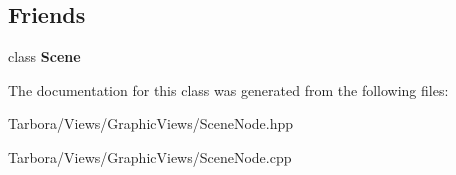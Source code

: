 \subsection*{Friends}
\begin{DoxyCompactItemize}
\item 
\mbox{\label{classTarbora_1_1SceneNode_a032858ae1fe02d2d1170981c2af2d67c}} 
class {\bfseries Scene}
\end{DoxyCompactItemize}


The documentation for this class was generated from the following files\+:\begin{DoxyCompactItemize}
\item 
Tarbora/\+Views/\+Graphic\+Views/Scene\+Node.\+hpp\item 
Tarbora/\+Views/\+Graphic\+Views/Scene\+Node.\+cpp\end{DoxyCompactItemize}
